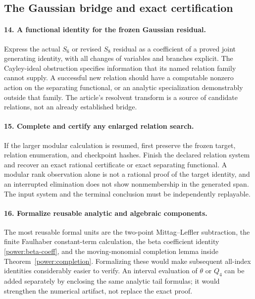 \documentclass[11pt,a4paper]{article}
\numberwithin{equation}{section}
\theoremstyle{definition}
\theoremstyle{remark}
\begin{document}
\subsection{The Gaussian bridge and exact certification}

\paragraph{14. A functional identity for the frozen Gaussian residual.}
Express the actual $S_6$ or revised $S_8$ residual as a coefficient
of a proved joint generating identity, with all changes of
variables and branches explicit. The Cayley-ideal obstruction
specifies information that its named relation family cannot
supply. A successful new relation should have a computable
nonzero action on the separating functional, or an analytic
specialization demonstrably outside that family. The article's
resolvent transform is a source of candidate relations, not an
already established bridge.

\paragraph{15. Complete and certify any enlarged relation search.}
If the larger modular calculation is resumed, first preserve the
frozen target, relation enumeration, and checkpoint hashes. Finish
the declared relation system and recover an exact rational
certificate or exact separating functional. A modular rank
observation alone is not a rational proof of the target identity,
and an interrupted elimination does not show nonmembership in
the generated span. The input system and the terminal conclusion
must be independently replayable.

\paragraph{16. Formalize reusable analytic and algebraic components.}
The most reusable formal units are the two-point
Mittag--Leffler subtraction, the finite Faulhaber constant-term
calculation, the beta coefficient identity
\eqref{power:beta-coeff}, and the moving-monomial completion lemma
inside Theorem~\ref{power:completion}. Formalizing these would
make subsequent all-index identities considerably easier to
verify. An interval evaluation of $\theta$ or $Q_4$ can be added
separately by enclosing the same analytic tail formulas; it
would strengthen the numerical artifact, not replace the exact
proof.
\end{document}
